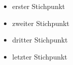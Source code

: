 \documentclass{article}
\begin{document}
\begin{itemize}
\item erster Stichpunkt
\item zweiter Stichpunkt
\item dritter Stichpunkt
\item letzter Stichpunkt
\end{itemize}
\end{document}

